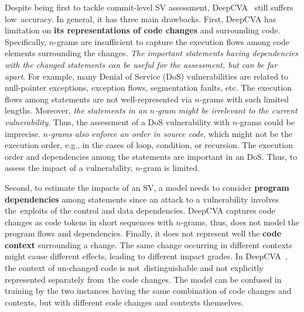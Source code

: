 

Despite being first to tackle commit-level SV assessment,
DeepCVA~\cite{deepCVA-ase21} still suffers low~accuracy.  In general,
it has three main drawbacks.  First, DeepCVA has limitation on {\bf
  its representations of code changes} and surrounding
code. Specifically, $n$-grams are insufficient to capture the
execution flows among code elements surrounding the changes. {\em The
  important statements having dependencies with the changed statements
  can be useful for the assessment, but can be far apart}. For
example, many Denial of Service (DoS) vulnerabilities are related to
null-pointer exceptions, exception flows, segmentation faults,
etc. The execution flows among statements are not well-represented via
$n$-grams with such limited lengths. Moreover, {\em the statements in
  an $n$-gram might be irrelevant to the current vulnerability}. Thus,
the assessment of a DoS vulnerability with $n$-grams could be
imprecise. {\em $n$-grams also enforce an order in source code}, which
might not be the execution order, e.g., in the cases of loop,
condition, or recursion. The execution order and dependencies among
the statements are important in an DoS. Thus, to assess the impact of
a vulnerability, $n$-gram is limited.

Second, to estimate the impacts of an SV, a model
needs to consider {\bf program dependencies} among statements since an
attack to a vulnerability involves the~exploits of the control and
data dependencies. DeepCVA captures code changes as code tokens in
short sequences with $n$-grams, thus, does not model the program flows
and dependencies. Finally, it does not represent well the {\bf code
  context} surrounding a change. The same change occurring in
different contexts might cause different effects, leading to different
impact grades. In DeepCVA~\cite{deepCVA-ase21}, the context of
un-changed code is not~distinguishable and not explicitly represented
separately from~the code changes. The model can be confused in
training by the two instances having the same combination of code
changes and contexts, but with different code changes and
contexts themselves.


